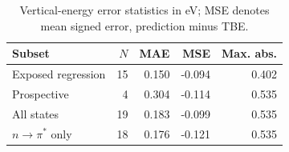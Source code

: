 \begin{table}[!htbp]
\centering\small
\caption{Vertical-energy error statistics in eV; MSE denotes mean signed error, prediction minus TBE.}\label{tab:stats}
\begin{tabular}{lrrrr}
\toprule
Subset & $N$ & MAE & MSE & Max. abs. \\
\midrule
Exposed regression & 15 & 0.150 & -0.094 & 0.402 \\
Prospective & 4 & 0.304 & -0.114 & 0.535 \\
All states & 19 & 0.183 & -0.099 & 0.535 \\
$n\rightarrow\pi^*$ only & 18 & 0.176 & -0.121 & 0.535 \\
\bottomrule
\end{tabular}
\end{table}

